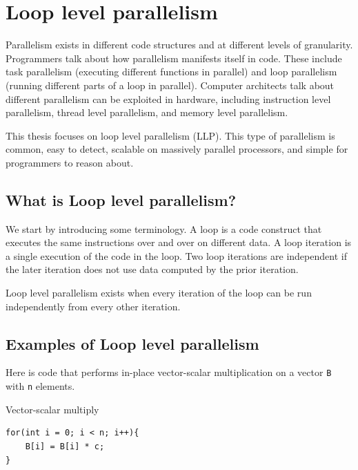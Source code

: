 \documentclass[12pt,twoside]{reedthesis}
\newenvironment{codeexample}[1][htb]
{\floatname{algorithm}{Code Example}%
	\begin{algorithm}[#1]%
	}{\end{algorithm}}
\begin{document}
	\section{Loop level parallelism}
	
		Parallelism exists in different code structures and at different levels of granularity. Programmers talk about how parallelism manifests itself in code. These include task parallelism (executing different functions in parallel) and  loop parallelism (running different parts of a loop in parallel). Computer architects talk about different parallelism can be exploited in hardware, including instruction level parallelism, thread level parallelism, and memory level parallelism. 
		
		This thesis focuses on loop level parallelism (LLP). This type of parallelism is common, easy to detect, scalable on massively parallel processors, and simple for programmers to reason about. 
		
		\subsection{What is Loop level parallelism?}
		
		We start by introducing some terminology. A loop is a code construct that executes the same instructions over and over on different data. A loop iteration is a single execution of the code in the loop. Two loop iterations are independent if the later iteration does not use data computed by the prior iteration. 
		
		Loop level parallelism exists when every iteration of the loop can be run independently from every other iteration. 
		
		\subsection{Examples of Loop level parallelism}
		
		Here is code that performs in-place vector-scalar multiplication on a vector \texttt{B} with \texttt{n} elements. 
		
		\begin{codeexample}
			\caption{Vector-scalar multiply}\label{vec-scal-mul}
		\begin{lstlisting}
for(int i = 0; i < n; i++){
	B[i] = B[i] * c;
}
		\end{lstlisting}
		\end{codeexample}
		
\end{document}
